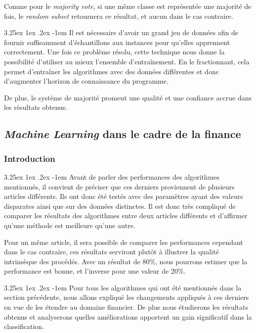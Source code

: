 \documentclass[a4paper, 11pt]{article}
\makeatletter
\renewcommand\paragraph{\@startsection{paragraph}{5}{\z@}%
  {3.25ex \@plus1ex \@minus.2ex}%
  {-1em}%
  {\normalfont\normalsize\bfseries}}
\makeatother
\begin{document}
Comme pour le \textit{majority vote}, si une même classe est représentée une majorité de fois, le \textit{random subset} retournera ce résultat, et aucun dans le cas contraire.

\paragraph{}
Il est nécessaire d'avoir un grand jeu de données afin de fournir suffisamment d'échantillons aux instances pour qu'elles apprennent correctement.
Une fois ce problème résolu, cette technique nous donne la possibilité d'utiliser au mieux l'ensemble d'entraînement. En le fractionnant, cela permet d'entraîner les algorithmes avec des données différentes et donc d'augmenter l'horizon de connaissance du programme.

De plus, le système de majorité promeut une qualité et une confiance accrue dans les résultats obtenus.


\subsection{\textit{Machine Learning} dans le cadre de la finance}\label{section machine learning finance}
\subsubsection{Introduction}
\paragraph{}
Avant de parler des performances des algorithmes mentionnés, il convient de préciser que ces derniers proviennent de plusieurs articles différents. Ils ont donc été testés avec des paramètres ayant des valeurs disparates ainsi que sur des données distinctes.
Il est donc très compliqué de comparer les résultats des algorithmes entre deux articles différents et d'affirmer qu'une méthode est meilleure qu'une autre. 

Pour un même article, il sera possible de comparer les performances  cependant dans le cas contraire, ces résultats serviront plutôt à illustrer la qualité intrinsèque des procédés. Avec un résultat de 80\%, nous pourrons estimer que la performance est bonne, et l'inverse pour une valeur de 20\%.

\paragraph{}
Pour tous les algorithmes qui ont été mentionnés dans la section précédente, nous allons expliqué les changements appliqués à ces derniers en vue de les étendre au domaine financier. De plus nous étudierons les résultats obtenus et analyserons quelles améliorations apportent un gain significatif dans la classification.
\end{document}
